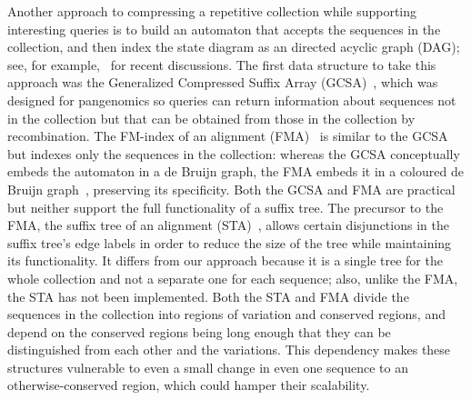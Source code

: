 Another approach to compressing a repetitive collection while supporting interesting queries is to build an automaton that accepts the sequences in the collection, and then index the state diagram as an directed acyclic graph (DAG); see, for example,~\cite{MaciucaEtAl16,PatenEtAl17,Siren17} for recent discussions.  The first data structure to take this approach was the Generalized Compressed Suffix Array (GCSA)~\cite{SVM14,Siren17}, which was designed for pangenomics so queries can return information about sequences not in the collection but that can be obtained from those in the collection by recombination.  The FM-index of an alignment (FMA)~\cite{NaKPLLMP16,NaEtAl17} is similar to the GCSA but indexes only the sequences in the collection: whereas the GCSA conceptually embeds the automaton in a de Bruijn graph, the FMA embeds it in a coloured de Bruijn graph~\cite{IqbalEtAl12}, preserving its specificity.  Both the GCSA and FMA are practical but neither support the full functionality of a suffix tree.  The precursor to the FMA, the suffix tree of an alignment (STA)~\cite{NPCHIMP13,NPLHLMP13}, allows certain disjunctions in the suffix tree's edge labels in order to reduce the size of the tree while maintaining its functionality.  It differs from our approach because it is a single tree for the whole collection and not a separate one for each sequence; also, unlike the FMA, the STA has not been implemented.  Both the STA and FMA divide the sequences in the collection into regions of variation and conserved regions, and depend on the conserved regions being long enough that they can be distinguished from each other and the variations.  This dependency makes these structures vulnerable to even a small change in even one sequence to an otherwise-conserved region, which could hamper their scalability.

